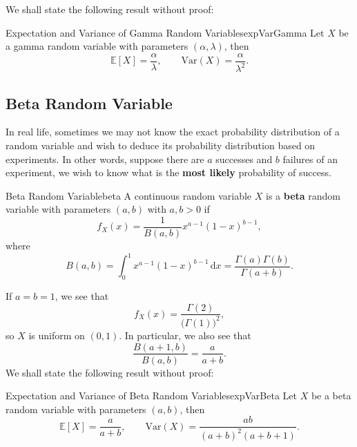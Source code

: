 \documentclass[math]{amznotes}
\theoremstyle{remark}
\newcommand{\0}{\mathbf{0}}
\newcommand{\1}{\mathbf{1}}
\renewcommand{\d}{\mathrm{d}}
\begin{document}
We shall state the following result without proof:
\begin{probox}{Expectation and Variance of Gamma Random Variables}{expVarGamma}
    Let $X$ be a gamma random variable with parameters $(\alpha, \lambda)$, then 
    \begin{equation*}
        \mathbb{E}[X] = \frac{\alpha}{\lambda}, \qquad \mathrm{Var}(X) = \frac{\alpha}{\lambda^2}.
    \end{equation*}
\end{probox}

\subsection{Beta Random Variable}
In real life, sometimes we may not know the exact probability distribution of a random variable and wish to deduce its probability distribution based on experiments. In other words, suppose there are $a$ successes and $b$ failures of an experiment, we wish to know what is the \textbf{most likely} probability of success.
\begin{dfnbox}{Beta Random Variable}{beta}
    A continuous random variable $X$ is a {\color{red} \textbf{beta}} random variable with parameters $(a, b)$ with $a, b > 0$ if 
    \begin{equation*}
        f_X(x) = \frac{1}{B(a, b)}x^{a - 1}(1 - x)^{b - 1},
    \end{equation*}
    where 
    \begin{equation*}
        B(a, b) = \int_{0}^{1}\!x^{a - 1}(1 - x)^{b - 1}\,\d x = \frac{\Gamma(a)\Gamma(b)}{\Gamma(a + b)}.
    \end{equation*}
\end{dfnbox}
If $a = b = 1$, we see that
\begin{equation*}
    f_X(x) = \frac{\Gamma(2)}{\bigl(\Gamma(1)\bigr)^2},
\end{equation*}
so $X$ is uniform on $(0, 1)$. In particular, we also see that
\begin{equation*}
    \frac{B(a + 1, b)}{B(a, b)} = \frac{a}{a + b}.
\end{equation*}
We shall state the following result without proof:
\begin{probox}{Expectation and Variance of Beta Random Variables}{expVarBeta}
    Let $X$ be a beta random variable with parameters $(a, b)$, then 
    \begin{equation*}
        \mathbb{E}[X] = \frac{a}{a + b}, \qquad \mathrm{Var}(X) = \frac{ab}{(a + b)^2(a + b + 1)}.
    \end{equation*}
\end{probox}
\end{document}
